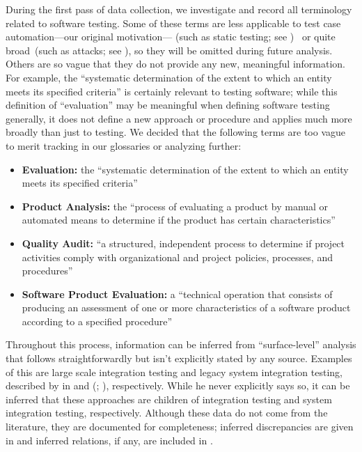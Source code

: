 During the first pass of data collection, we investigate and record all
terminology related to software testing. Some of these terms are less
applicable to test case automation---our original motivation---%
\ifnotpaper(such as static testing; see %
)\ \fi%
or quite broad\ifnotpaper\ (such as attacks; see %
    )\fi, so they will be omitted during future analysis.
\ifnotpaper
    Others are so vague that they do not provide any new, meaningful
    information. For example, the ``systematic determination of the extent to
    which an entity meets its specified criteria'' \citep[p.~167]{IEEE2017} is
    certainly relevant to testing software; while this definition of
    ``evaluation'' may be meaningful when defining software testing generally,
    it does not define a new approach or procedure and applies much more
    broadly than just to testing. We decided that the
    following terms are too vague to merit tracking in our glossaries or
    analyzing further:
    \begin{itemize}
        \item \textbf{Evaluation:} the ``systematic determination of the extent
              to which an entity meets its specified criteria''
              \citep[p.~167]{IEEE2017}
        \item \textbf{Product Analysis:} the ``process of evaluating a product by
              manual or automated means to determine if the product has certain
              characteristics'' \citep[p.~343]{IEEE2017}
        \item \textbf{Quality Audit:} ``a structured, independent process to
              determine if project activities comply with organizational and
              project policies, processes, and procedures'' \citep[p.~361]{IEEE2017}
        \item \textbf{Software Product Evaluation:} a ``technical operation that
              consists of producing an assessment of one or more characteristics
              of a software product according to a specified procedure''
              \citep[p.~424]{IEEE2017}
    \end{itemize}

    \label{infers}
    Throughout this process, information can be inferred from ``surface-level''
    analysis that follows straightforwardly but isn't explicitly stated by any
    source. Examples of this are large scale integration testing and legacy
    system integration testing, described by \citeauthor{Gerrard2000a} in
    \citeyearpar[p.~30]{Gerrard2000b} and (\citeyear[Tab.~2]{Gerrard2000a};
    \citeyear[Tab.~1]{Gerrard2000b}), respectively. While he never explicitly
    says so, it can be inferred that these approaches are children of
    integration testing and system integration testing, respectively.
    Although these data do not come from the literature, they are documented
    for completeness; inferred discrepancies are given in 
    and inferred relations, if any, are included in \recFigs{}.
\fi

